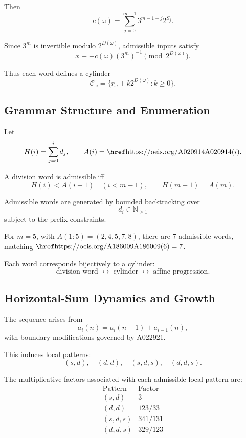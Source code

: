 \documentclass[12pt, oneside]{article}
\numberwithin{equation}{section}
\theoremstyle{definition}
\theoremstyle{plain}
\theoremstyle{remark}
\begin{document}
Then
\[
c(\omega)
=
\sum_{j=0}^{m-1}
3^{m-1-j} 2^{S_j}.
\]

Since $3^m$ is invertible modulo $2^{D(\omega)}$, admissible inputs satisfy
\[
x \equiv -c(\omega)(3^m)^{-1} \pmod{2^{D(\omega)}}.
\]

Thus each word defines a cylinder
\[
\mathcal{C}_\omega = \{ r_\omega + k2^{D(\omega)} : k \ge 0 \}.
\]

\subsection{Grammar Structure and Enumeration}
\label{app:spine-grammar}

Let
\[
H(i) = \sum_{j=0}^i d_j,
\qquad A(i) = \text{\OEIS{A020914}}(i).
\]

A division word is admissible iff
\[
H(i) < A(i+1) \quad (i < m-1),
\qquad
H(m-1) = A(m).
\]

Admissible words are generated by bounded backtracking over
\[
d_i \in \mathbb{N}_{\ge 1}
\]
subject to the prefix constraints.

For $m=5$, with $A(1{:}5) = (2,4,5,7,8)$, there are 7 admissible words,
matching $\text{\OEIS{A186009}}(6)=7$.

Each word corresponds bijectively to a cylinder:
\[
\text{division word} \;\leftrightarrow\; \text{cylinder} \;\leftrightarrow\; \text{affine progression}.
\]

\subsection{Horizontal-Sum Dynamics and Growth}
\label{app:spine-growth}

The sequence  arises from
\[
a_i(n) = a_i(n-1) + a_{i-1}(n),
\]
with boundary modifications governed by A022921.

This induces local patterns:
\[
(s,d), \quad (d,d), \quad (s,d,s), \quad (d,d,s).
\]

The multiplicative factors associated with each admissible local pattern are:
\[
\begin{array}{c|c}
\text{Pattern} & \text{Factor} \\
\hline
(s,d) & 3 \\
(d,d) & 123/33 \\
(s,d,s) & 341/131 \\
(d,d,s) & 329/123
\end{array}
\]
\end{document}
